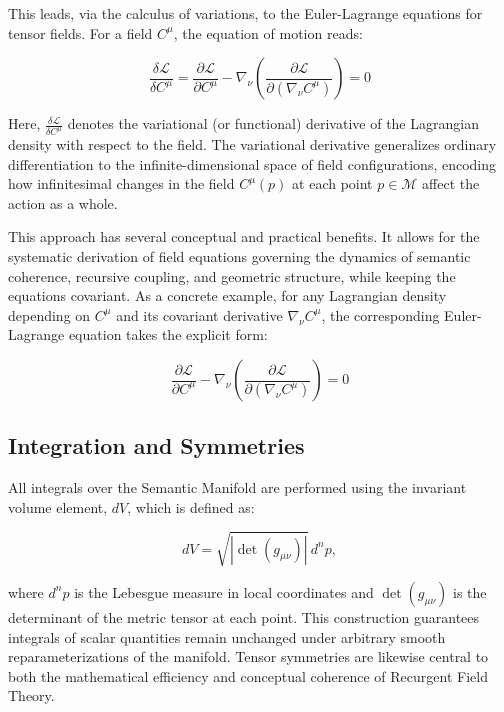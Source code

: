 This leads, via the calculus of variations, to the Euler-Lagrange equations for tensor fields. For a field \(C^\mu\), the equation of motion reads:

\begin{equation}
\frac{\delta \mathcal{L}}{\delta C^\mu} = \frac{\partial \mathcal{L}}{\partial C^\mu} - \nabla_\nu \left( \frac{\partial \mathcal{L}}{\partial (\nabla_\nu C^\mu)} \right) = 0
\end{equation}

Here, \(\frac{\delta \mathcal{L}}{\delta C^\mu}\) denotes the variational (or functional) derivative of the Lagrangian density with respect to the field. The variational derivative generalizes ordinary differentiation to the infinite-dimensional space of field configurations, encoding how infinitesimal changes in the field \(C^\mu(p)\) at each point \(p \in \mathcal{M}\) affect the action as a whole.

This approach has several conceptual and practical benefits. It allows for the systematic derivation of field equations governing the dynamics of semantic coherence, recursive coupling, and geometric structure, while keeping the equations covariant. As a concrete example, for any Lagrangian density depending on \(C^\mu\) and its covariant derivative \(\nabla_\nu C^\mu\), the corresponding Euler-Lagrange equation takes the explicit form:

\begin{equation}
\frac{\partial \mathcal{L}}{\partial C^\mu} - \nabla_\nu \left( \frac{\partial \mathcal{L}}{\partial (\nabla_\nu C^\mu)} \right) = 0
\end{equation}


\subsection{Integration and Symmetries}
\label{2.4.5:integration_and_symmetries}

All integrals over the Semantic Manifold are performed using the invariant volume element, \(dV\), which is defined as:

\begin{equation}
dV = \sqrt{|\det(g_{\mu\nu})|} \, d^n p,
\end{equation}

where \(d^n p\) is the Lebesgue measure in local coordinates and \(\det(g_{\mu\nu})\) is the determinant of the metric tensor at each point. This construction guarantees integrals of scalar quantities remain unchanged under arbitrary smooth reparameterizations of the manifold. Tensor symmetries are likewise central to both the mathematical efficiency and conceptual coherence of Recurgent Field Theory.

